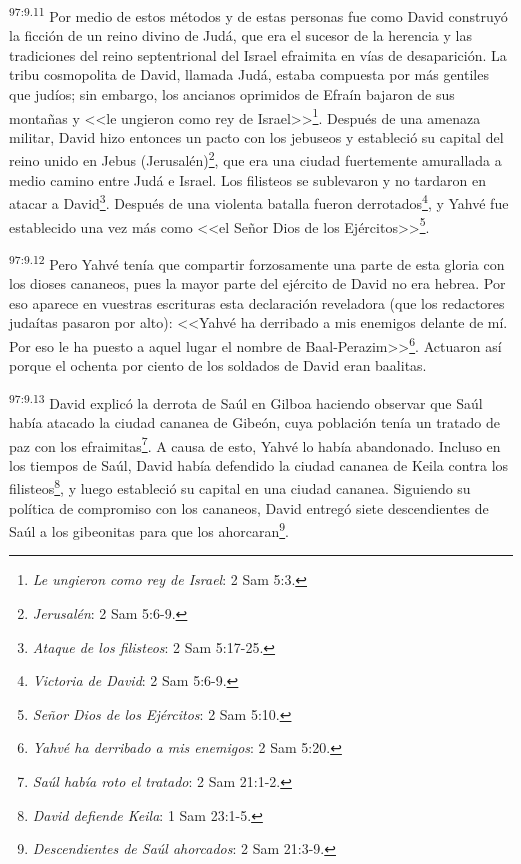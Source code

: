 \par
\textsuperscript{97:9.11} Por medio de estos métodos y de estas personas fue como David construyó la ficción de un reino divino de Judá, que era el sucesor de la herencia y las tradiciones del reino septentrional del Israel efraimita en vías de desaparición. La tribu cosmopolita de David, llamada Judá, estaba compuesta por más gentiles que judíos; sin embargo, los ancianos oprimidos de Efraín bajaron de sus montañas y <<le ungieron como rey de Israel>>\footnote{\textit{Le ungieron como rey de Israel}: 2 Sam 5:3.}. Después de una amenaza militar, David hizo entonces un pacto con los jebuseos y estableció su capital del reino unido en Jebus (Jerusalén)\footnote{\textit{Jerusalén}: 2 Sam 5:6-9.}, que era una ciudad fuertemente amurallada a medio camino entre Judá e Israel. Los filisteos se sublevaron y no tardaron en atacar a David\footnote{\textit{Ataque de los filisteos}: 2 Sam 5:17-25.}. Después de una violenta batalla fueron derrotados\footnote{\textit{Victoria de David}: 2 Sam 5:6-9.}, y Yahvé fue establecido una vez más como <<el Señor Dios de los Ejércitos>>\footnote{\textit{Señor Dios de los Ejércitos}: 2 Sam 5:10.}.

\par
\textsuperscript{97:9.12} Pero Yahvé tenía que compartir forzosamente una parte de esta gloria con los dioses cananeos, pues la mayor parte del ejército de David no era hebrea. Por eso aparece en vuestras escrituras esta declaración reveladora (que los redactores judaítas pasaron por alto): <<Yahvé ha derribado a mis enemigos delante de mí. Por eso le ha puesto a aquel lugar el nombre de Baal-Perazim>>\footnote{\textit{Yahvé ha derribado a mis enemigos}: 2 Sam 5:20.}. Actuaron así porque el ochenta por ciento de los soldados de David eran baalitas.

\par
\textsuperscript{97:9.13} David explicó la derrota de Saúl en Gilboa haciendo observar que Saúl había atacado la ciudad cananea de Gibeón, cuya población tenía un tratado de paz con los efraimitas\footnote{\textit{Saúl había roto el tratado}: 2 Sam 21:1-2.}. A causa de esto, Yahvé lo había abandonado. Incluso en los tiempos de Saúl, David había defendido la ciudad cananea de Keila contra los filisteos\footnote{\textit{David defiende Keila}: 1 Sam 23:1-5.}, y luego estableció su capital en una ciudad cananea. Siguiendo su política de compromiso con los cananeos, David entregó siete descendientes de Saúl a los gibeonitas para que los ahorcaran\footnote{\textit{Descendientes de Saúl ahorcados}: 2 Sam 21:3-9.}.

